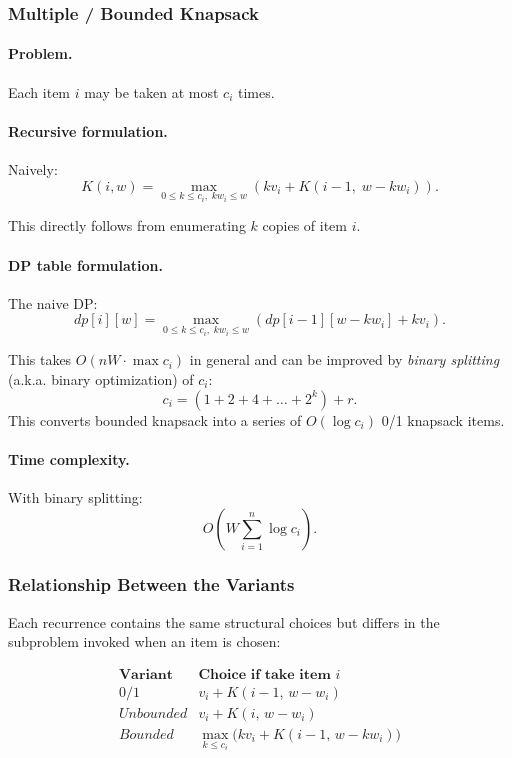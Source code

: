 \documentclass[9pt]{extarticle}
\begin{document}
\subsubsection{Multiple / Bounded Knapsack}

\paragraph{Problem.}
Each item $i$ may be taken at most $c_i$ times.

\paragraph{Recursive formulation.}
Naively:
\[
K(i,w) = \max_{0 \le k \le c_i,\; k w_i \le w}
\left(
k v_i + K(i-1,\; w - k w_i)
\right).
\]

This directly follows from enumerating $k$ copies of item $i$.

\paragraph{DP table formulation.}
The naive DP:
\[
dp[i][w]
=
\max_{0 \le k \le c_i,\; k w_i \le w}
\left(
dp[i-1][w-k w_i] + k v_i
\right).
\]

This takes $O(n W \cdot \max c_i)$ in general and can be improved by
\emph{binary splitting} (a.k.a. binary optimization) of $c_i$:
\[
c_i = (1 + 2 + 4 + \dots + 2^k) + r.
\]
This converts bounded knapsack into a series of $O(\log c_i)$ 0/1 knapsack items.

\paragraph{Time complexity.}
With binary splitting:  
\[
O\!\left(W \sum_{i=1}^n \log c_i\right).
\]

\subsubsection{Relationship Between the Variants}

Each recurrence contains the same structural choices but differs in the 
subproblem invoked when an item is chosen:

\[
\begin{array}{c|c}
\textbf{Variant} & \textbf{Choice if take item $i$} \\ \hline
0/1 & v_i + K(i-1,\, w-w_i) \\[4pt]
Unbounded & v_i + K(i,\, w-w_i) \\[4pt]
Bounded & \max_{k\le c_i} \bigl(k v_i + K(i-1,\, w-k w_i)\bigr)
\end{array}
\]
\end{document}
